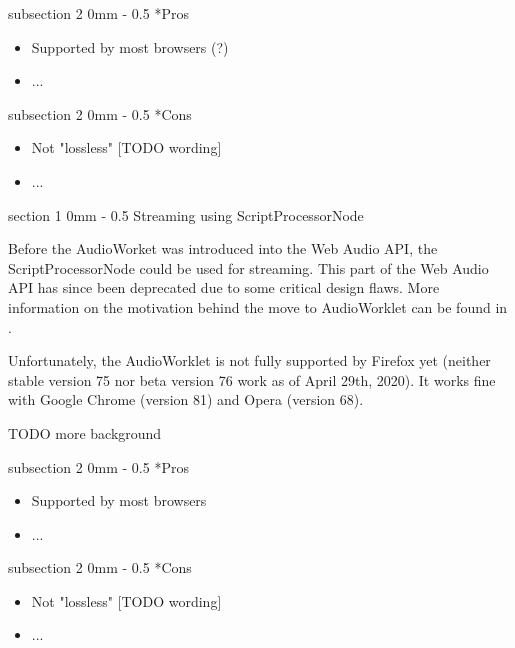 \documentclass[11pt, a4paper, twoside]{article}
\makeatletter
\renewcommand{\subsection}{\@startsection
   {subsection}%
   {2}%
   {0mm}%
   {-\baselineskip}%
   {0.5\baselineskip}%
   {\bfseries\sffamily\large}}%
\renewcommand{\section}{\@startsection
   {section}%
   {1}%
   {0mm}%
   {-\baselineskip}%
   {0.5\baselineskip}%
   {\bfseries\sffamily\Large}}%
\makeatother
\begin{document}
\subsection*{Pros}
\begin{itemize}
\item Supported by most browsers (?)
\item ...
  \end{itemize}

\subsection*{Cons}
\begin{itemize}
\item Not "lossless" [TODO wording]
\item ...
\end{itemize}

\section{Streaming using ScriptProcessorNode}

Before the AudioWorket was introduced into the Web Audio API, the ScriptProcessorNode\cite{scriptprocessornode} could be used for streaming. This part of the Web Audio API has since been deprecated due to some critical design flaws. More information on the motivation behind the move to AudioWorklet can be found in \cite{icmc}.

Unfortunately, the AudioWorklet is not fully supported by Firefox yet (neither stable version 75 nor beta version 76 work as of April 29th, 2020). It works fine with Google Chrome (version 81) and Opera (version 68).

TODO more background

\subsection*{Pros}
\begin{itemize}
\item Supported by most browsers
\item ...
  \end{itemize}

\subsection*{Cons}
\begin{itemize}
\item Not "lossless" [TODO wording]
\item ...
\end{itemize}
\end{document}
